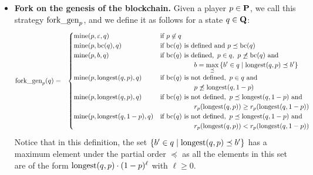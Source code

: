 \begin{itemize}
\item {\bf Fork on the genesis of the blockchain.} Given a player $p \in \mathbf{P}$, we call this strategy $\text{\rm fork\_gen}_p$, and we define it as follows for a state $q \in \mathbf{Q}$:
\begin{eqnarray*}
\text{\rm fork\_gen}_p(q) & = &
\begin{cases}
\text{\rm mine}(p,\varepsilon,q) & \text{if } p \not\in q\\
\text{\rm mine}(p,\text{bc}(q),q) &  \text{if } \text{bc}(q) \text{ is defined and } p \preceq \text{bc}(q)\\
\text{\rm mine}(p,b,q) &  \text{if } \text{bc}(q) \text{ is defined},\  p \in q,\ p \not\preceq \text{bc}(q)
\text{ and}\\
&  \hspace{50pt} {\displaystyle b = \max_{\preceq} \, \{ b' \in q \mid {\text{\rm longest}}(q,p) \preceq b'\}}\\
\text{\rm mine}(p,{\text{\rm longest}}(q,p),q) &  \text{if } \text{bc}(q) \text{ is not defined},\ p \in q \text{ and}\\
& \hspace{50pt} p \not\preceq {\text{\rm longest}}(q,1-p)\\
\text{\rm mine}(p,{\text{\rm longest}}(q,p),q) &  \text{if } \text{bc}(q) \text{ is not defined},\ p \preceq {\text{\rm longest}}(q,1-p) \text{ and}\\
& \hspace{50pt} r_p({\text{\rm longest}}(q,p)) \geq r_p({\text{\rm longest}}(q,1-p))\\
\text{\rm mine}(p,{\text{\rm longest}}(q,1-p),q) &  \text{if } \text{bc}(q) \text{ is not defined},\  p \preceq {\text{\rm longest}}(q,1-p) \text{ and}\\
& \hspace{50pt} r_p({\text{\rm longest}}(q,p)) < r_p({\text{\rm longest}}(q,1-p))
\end{cases}
\end{eqnarray*}
Notice that in this definition, the set $\{ b' \in q \mid {\text{\rm longest}}(q,p) \preceq b'\}$ has a maximum element under the partial order $\preceq$ as all the elements in this set are of the form ${\text{\rm longest}}(q,p) \cdot (1-p)^\ell$ with $\ell \geq 0$.


\end{itemize}
